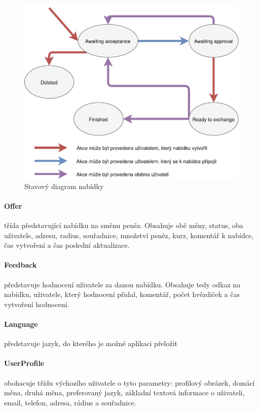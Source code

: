 \begin{figure}[h]
    \centering
    \includegraphics[width=1.0\textwidth]{media/state-diagram}
    \caption{Stavový diagram nabídky}
    \label{fig:implementation:state-diagram}
\end{figure}

\paragraph*{Offer} třída představující nabídku na směnu peněz. Obsahuje obě měny, status, oba uživatele, adresu, radius, souřadnice, množství peněz, kurz, komentář k nabídce, čas vytvoření a čas poslední aktualizace.
\paragraph*{Feedback} představuje hodnocení uživatele za danou nabídku. Obsahuje tedy odkaz na nabídku, uživatele, který hodnocení přidal, komentář, počet hvězdiček a čas vytvoření hodnocení.
\paragraph*{Language} představuje jazyk, do kterého je možné aplikaci přeložit
\paragraph*{UserProfile} obohacuje třídu výchozího uživatele o tyto parametry: profilový obrázek, domácí měna, druhá měna, preferovaný jazyk, základní textová informace o uživateli, email, telefon, adresa, rádius a souřadnice.

